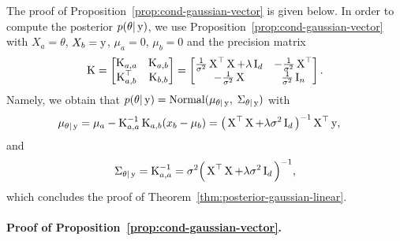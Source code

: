 The proof of Proposition~\ref{prop:cond-gaussian-vector} is given below.
In order to compute the posterior $p(\theta | \by)$, we use Proposition~\ref{prop:cond-gaussian-vector} with $X_a = \theta$, $X_b = \by$, $\mu_a = 0$, $\mu_b = 0$ and the precision matrix
\begin{equation*}
	\bK =
	\begin{bmatrix}
		\bK_{a, a} & \bK_{a, b} \\
		\bK_{a, b}^\top & \bK_{b, b}
	\end{bmatrix}
	=
	\begin{bmatrix}
	\frac{1}{\sigma^2} \bX^\top \bX + \lambda \bI_d & - \frac{1}{\sigma^2} \bX^\top  \\
	- \frac{1}{\sigma^2} \bX & \frac{1}{\sigma^2} \bI_n
	\end{bmatrix}.
\end{equation*}
Namely, we obtain that $p(\theta | \by) = \nor(\mu_{\theta | \by}, \; \bSigma_{\theta | \by})$ with
\begin{align*}
	\mu_{\theta | \by} &= \mu_a - \bK_{a, a}^{-1} \bK_{a, b} (x_b - \mu_b) 
	= \big( \bX^\top \bX + \lambda \sigma^2 \bI_d \big)^{-1} \bX^\top \by,
\end{align*}
and
\begin{equation*}
	\bSigma_{\theta | \by} = \bK_{a, a}^{-1} = \sigma^2 \Big( \bX^\top \bX + \lambda \sigma^2 \bI_d \Big)^{-1},
\end{equation*}
which concludes the proof of Theorem~\ref{thm:posterior-gaussian-linear}.

\paragraph{Proof of Proposition~\ref{prop:cond-gaussian-vector}.} %

